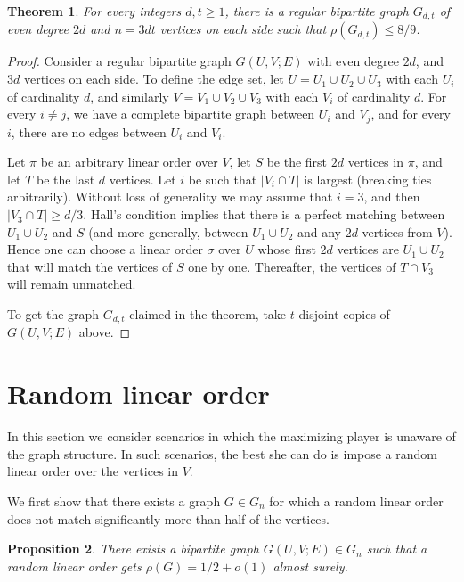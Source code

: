 \documentclass[11pt]{article}
\numberwithin{equation}{section}
\newtheorem{theorem}{Theorem}[section]
\newtheorem{proposition}[theorem]{Proposition}
\theoremstyle{definition}
\theoremstyle{plain}
\theoremstyle{plain}
\begin{document}
\begin{theorem}\label{thm:reg_89}
	For every integers $d, t \ge 1$, there is a regular bipartite graph $G_{d,t}$ of even degree $2d$ and $n= 3dt$ vertices on each side such that $\rho(G_{d,t}) \le 8/9$.
\end{theorem}

\begin{proof}
	Consider a regular bipartite graph $G(U,V;E)$ with even degree $2d$, and $3d$ vertices on each side. To define the edge set, let $U = U_1 \cup U_2 \cup U_3$ with each $U_i$ of cardinality $d$, and similarly $V = V_1 \cup V_2 \cup V_3$ with each $V_i$ of cardinality $d$. For every $i \not= j$, we have a complete bipartite graph between $U_i$ and $V_j$, and for every $i$, there are no edges between $U_i$ and $V_i$.
	
	Let $\pi$ be an arbitrary linear order over $V$, let $S$ be the first $2d$ vertices in $\pi$, and let $T$ be the last $d$ vertices. Let $i$ be such that $|V_i \cap T|$ is largest (breaking ties arbitrarily). Without loss of generality we may assume that $i = 3$, and then $|V_3 \cap T| \ge d/3$. Hall's condition implies that there is a perfect matching between $U_1 \cup U_2$ and $S$ (and more generally, between $U_1 \cup U_2$ and any $2d$ vertices from $V$). Hence one can choose a linear order $\sigma$ over $U$ whose first $2d$ vertices are $U_1 \cup U_2$ that will match the vertices of $S$ one by one. Thereafter, the vertices of $T \cap V_3$ will remain unmatched.
	
	To get the graph $G_{d,t}$ claimed in the theorem, take $t$ disjoint copies of $G(U,V;E)$ above.
\end{proof}






\section{Random linear order}
\label{sec:random}

In this section we consider scenarios in which the maximizing player is unaware of the graph structure.
In such scenarios, the best she can do is impose a random linear order over the vertices in $V$.

We first show that there exists a graph $G \in G_n$ for which a random linear order does not match significantly more than %
half of the vertices.%

\begin{proposition}
	There exists a bipartite graph $G(U,V;E) \in G_n$ such that a random linear order gets $\rho(G)=1/2+o(1)$ almost surely.
	\label{ex:half}
\end{proposition}
\end{document}

